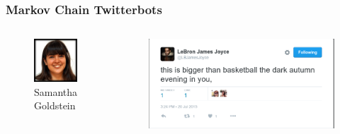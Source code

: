\documentclass{beamer}
\theoremstyle{mystyle}
\begin{document}
\begin{frame}

\frametitle{Markov Chain Twitterbots}

\begin{columns}
		\begin{figure}
			\includegraphics[scale=0.008]{sam.jpg}
			\caption{Samantha Goldstein}
		\end{figure}
		\begin{figure}
			\vspace{0.2in}
			\includegraphics[scale=0.35]{ljj.png}
		\end{figure}
	
\end{columns}

\end{frame}
\end{document}
